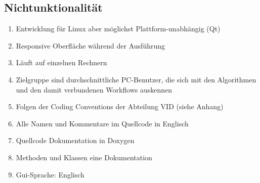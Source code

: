 \subsection{Nichtunktionalität}
\begin{enumerate}[ align=left, label={\textbf{\textbackslash NF1\arabic*0\textbackslash}} ]
\item Entwicklung für Linux aber möglichst Plattform-unabhängig (Qt)
\item Responsive Oberfläche während der Ausführung
\item Läuft auf einzelnen Rechnern
\item Zielgruppe sind durchschnittliche PC-Benutzer, die sich mit den Algorithmen und den damit
verbundenen Workflows auskennen
\item Folgen der Coding Conventions der Abteilung VID (siehe Anhang)
\item Alle Namen und Kommentare im Quellcode in Englisch
\item Quellcode Dokumentation in Doxygen
\item Methoden und Klassen eine Dokumentation
\item Gui-Sprache: Englisch
\end{enumerate}


